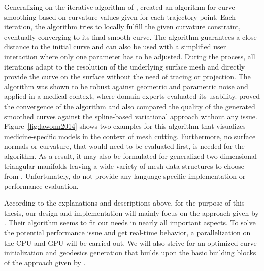 \documentclass{stdlocal}
\begin{document}
Generalizing on the iterative algorithm of \textcite{martinez2005}, \textcite{lawonn2014} created an algorithm for curve smoothing based on curvature values given for each trajectory point.
Each iteration, the algorithm tries to locally fulfill the given curvature constraint, eventually converging to its final smooth curve.
The algorithm guarantees a close distance to the initial curve and can also be used with a simplified user interaction where only one parameter has to be adjusted.
During the process, all iterations adapt to the resolution of the underlying surface mesh and directly provide the curve on the surface without the need of tracing or projection.
The algorithm was shown to be robust against geometric and parametric noise and applied in a medical context, where domain experts evaluated its usability.
\textcite{lawonn2014} proved the convergence of the algorithm and also compared the quality of the generated smoothed curves against the spline-based variational approach without any issue.
Figure~\ref{fig:lawonn2014} shows two examples for this algorithm that visualizes medicine-specific models in the context of mesh cutting.
Furthermore, no surface normals or curvature, that would need to be evaluated first, is needed for the algorithm.
As a result, it may also be formulated for generalized two-dimensional triangular manifolds leaving a wide variety of mesh data structures to choose from \autocite{guibas1985}.
Unfortunately, \textcite{lawonn2014} do not provide any language-specific implementation or performance evaluation.

According to the explanations and descriptions above, for the purpose of this thesis, our design and implementation will mainly focus on the approach given by \textcite{lawonn2014}.
Their algorithm seems to fit our needs in nearly all important aspects.
To solve the potential performance issue and get real-time behavior, a parallelization on the CPU and GPU will be carried out.
We will also strive for an optimized curve initialization and geodesics generation that builds upon the basic building blocks of the approach given by \textcite{mancinelli2022}.


\end{document}
